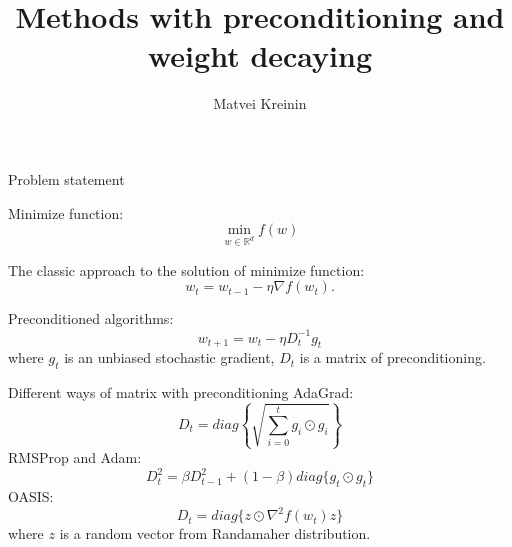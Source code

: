 \documentclass[aspectratio=169, 12pt]{beamer}
\title[\hbox to 56mm{Feature}]{Methods with preconditioning and weight decaying}
\author[M.\,K.~Kreinin]{Matvei Kreinin}
\institute{Moscow Institute of Physics and Technology}
\date{\footnotesize
A. Beznosikov
\par\bigskip\small 2023}
\begin{document}
\maketitle

\begin{frame}{Problem statement}

    Minimize function:
    \begin{equation}
    \label{eq:general}
        \min_{w \in \mathbb{R}^d} f(w)
    \end{equation} 
    
    The classic approach to the solution of minimize function:
    \begin{equation*}
        w_t = w_{t-1} - \eta \nabla f(w_t).
    \end{equation*}

    Preconditioned algorithms:
    \begin{equation*}
        w_{t+1} = w_t - \eta D_t^{-1}g_t
    \end{equation*}
    where $g_t$ is an unbiased stochastic gradient, $D_t$ is a matrix of preconditioning.
    
    
\end{frame}

\begin{frame}{Different ways of matrix with preconditioning}
    AdaGrad:
    \begin{equation*}
        D_t = diag \left\{\sqrt{\sum\limits_{i=0}^t g_i \odot g_i} \right\}
    \end{equation*}
    RMSProp and Adam:
    \begin{equation*}
        D_t^2 = \beta D_{t-1}^2 + (1-\beta) diag \{g_t \odot g_t \}
    \end{equation*}
    OASIS:
    \begin{equation*}
        D_t = diag \{z \odot \nabla^2 f(w_t) z\}
    \end{equation*}
    where $z$ is a random vector from Randamaher distribution.
\end{frame}
\end{document}
